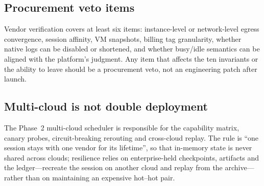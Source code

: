 \subsection{Procurement veto items}

Vendor verification covers at least six items: instance-level or network-level egress convergence, session affinity, VM snapshots, billing tag granularity, whether native logs can be disabled or shortened, and whether busy/idle semantics can be aligned with the platform's judgment. Any item that affects the ten invariants or the ability to leave should be a procurement veto, not an engineering patch after launch.

\subsection{Multi-cloud is not double deployment}

The Phase~2 multi-cloud scheduler is responsible for the capability matrix, canary probes, circuit-breaking rerouting and cross-cloud replay. The rule is ``one session stays with one vendor for its lifetime'', so that in-memory state is never shared across clouds; resilience relies on enterprise-held checkpoints, artifacts and the ledger---recreate the session on another cloud and replay from the archive---rather than on maintaining an expensive hot–hot pair.

